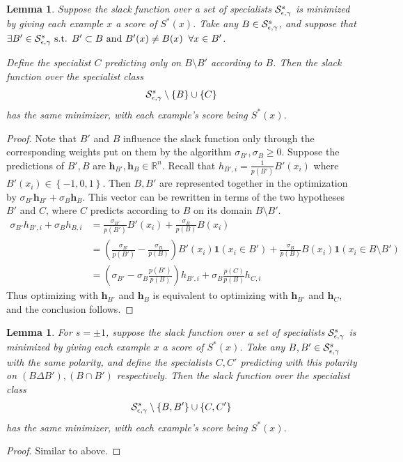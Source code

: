 \documentclass{article}
\newtheorem{lemma}[theorem]{Lemma}
\newcommand{\x}{\vec{x}}
\newcommand{\RR}{\mathbb{R}}      %
\newcommand{\ifn}{\mathbf{1}} %
\newcommand{\lrp}[1]{\left(#1\right)}
\newcommand{\lrsetb}[1]{\left\{#1\right\}}
\newcommand{\vh}{\mathbf{h}}
\begin{document}
\begin{lemma}
\label{lem:replacespec}
Suppose the slack function over a set of specialists ${\cal S}_{\epsilon,\gamma}^{s}$ is minimized by giving each example $x$ a score of $S^* (x)$. 
Take any $B \in {\cal S}_{\epsilon,\gamma}^{s}$, and suppose that $\exists B' \in {\cal S}_{\epsilon,\gamma}^{s} \mbox{ s.t. } B' \subset B \mbox{ and } B' (x) \neq B (x) \;\;\forall x \in B'$. 

Define the specialist $C$ predicting only on $B \setminus B'$ according to $B$. 
Then the slack function over the specialist class 
$$ \SepsGam^{s} \setminus \lrsetb{B} \cup \lrsetb{C} $$
has the same minimizer, with each example's score being $S^* (x)$. 
\end{lemma}
\begin{proof}
Note that $B'$ and $B$ influence the slack function only through the corresponding weights put on them by the algorithm $\sigma_{B'}, \sigma_{B} \geq 0$. 
Suppose the predictions of $B', B$ are $\vh_{B'}, \vh_{B} \in \RR^{n}$. 
Recall that $h_{B', i} = \frac{1}{p (B')} B' (x_i)$ where $B' (x_i) \in \lrsetb{-1, 0, 1}$. 
Then $B, B'$ are represented together in the optimization by $\sigma_{B'} \vh_{B'} + \sigma_{B} \vh_{B}$. 
This vector can be rewritten in terms of the two hypotheses $B'$ and $C$, where $C$ predicts according to $B$ on its domain $B \setminus B'$. 
\begin{align*}
\sigma_{B'} h_{B', i} + \sigma_{B} h_{B, i} 
&= \frac{\sigma_{B'}}{p (B')} B' (x_i) + \frac{\sigma_{B}}{p (B)} B (x_i) \\ 
&= \lrp{ \frac{\sigma_{B'}}{p (B')} - \frac{\sigma_{B}}{p (B)} } B' (x_i) \ifn(x_i \in B') + \frac{\sigma_{B}}{p (B)} B (x_i) \ifn(x_i \in B \setminus B') \\ 
&= \lrp{ \sigma_{B'} - \sigma_{B} \frac{p (B')}{p (B)} } h_{B', i} + \sigma_{B} \frac{p (C)}{p (B)} h_{C, i} 
\end{align*}
Thus optimizing with $\vh_{B'}$ and $\vh_{B}$ is equivalent to optimizing with $\vh_{B'}$ and $\vh_{C}$, and the conclusion follows.
\end{proof}

\begin{lemma}
\label{lem:replacesamesign}
For $s = \pm 1$, suppose the slack function over a set of specialists ${\cal S}_{\epsilon,\gamma}^{s}$ is minimized by giving each example $x$ a score of $S^* (x)$. 
Take any $B, B' \in {\cal S}_{\epsilon,\gamma}^{s}$ with the same polarity, 
and define the specialists $C, C'$ predicting with this polarity on $(B \Delta B'), (B \cap B')$ respectively. 
Then the slack function over the specialist class 
$$ \SepsGam^{s} \setminus \lrsetb{B, B'} \cup \lrsetb{C, C'} $$
has the same minimizer, with each example's score being $S^* (x)$. 
\end{lemma}
\begin{proof}
Similar to above.
\end{proof}
\end{document}
